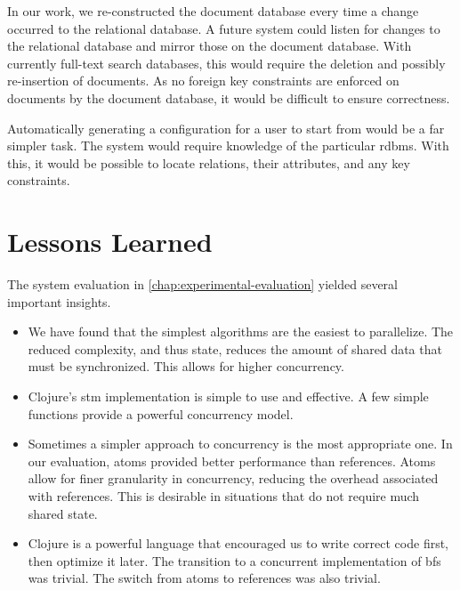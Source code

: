 		In our work, we re-constructed the document database every time a change occurred to the relational database.  A future system could listen for changes to the relational database and mirror those on the document database.  With currently full-text search databases, this would require the deletion and possibly re-insertion of documents.  As no foreign key constraints are enforced on documents by the document database, it would be difficult to ensure correctness.
		
		Automatically generating a configuration for a user to start from would be a far simpler task.  The system would require knowledge of the particular \gls{rdbms}.  With this, it would be possible to locate relations, their attributes, and any key constraints.
		
	\section{Lessons Learned}
		The system evaluation in \cref{chap:experimental-evaluation} yielded several important insights.
		
		\begin{itemize}
			\item We have found that the simplest algorithms are the easiest to parallelize.  The reduced complexity, and thus state, reduces the amount of shared data that must be synchronized.  This allows for higher concurrency.
			\item Clojure's \gls{stm} implementation is simple to use and effective.  A few simple functions provide a powerful concurrency model.
			\item Sometimes a simpler approach to concurrency is the most appropriate one.  In our evaluation, atoms provided better performance than references.  Atoms allow for finer granularity in concurrency, reducing the overhead associated with references.  This is desirable in situations that do not require much shared state.
			\item Clojure is a powerful language that encouraged us to write correct code first, then optimize it later.  The transition to a concurrent implementation of \gls{bfs} was trivial.  The switch from atoms to references was also trivial.
		\end{itemize}
